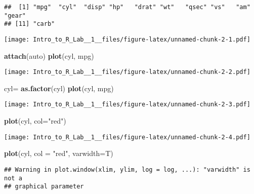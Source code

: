 \documentclass[]{article}
\newenvironment{Shaded}{\begin{snugshade}}{\end{snugshade}}
\newcommand{\KeywordTok}[1]{\textcolor[rgb]{0.13,0.29,0.53}{\textbf{#1}}}
\newcommand{\DataTypeTok}[1]{\textcolor[rgb]{0.13,0.29,0.53}{#1}}
\newcommand{\StringTok}[1]{\textcolor[rgb]{0.31,0.60,0.02}{#1}}
\newcommand{\OperatorTok}[1]{\textcolor[rgb]{0.81,0.36,0.00}{\textbf{#1}}}
\newcommand{\NormalTok}[1]{#1}
\begin{document}
\begin{verbatim}
##  [1] "mpg"  "cyl"  "disp" "hp"   "drat" "wt"   "qsec" "vs"   "am"   "gear"
## [11] "carb"
\end{verbatim}

\begin{Shaded}
\end{Shaded}

\texttt{[image: Intro\_to\_R\_Lab\_\_1\_\_files/figure-latex/unnamed-chunk-2-1.pdf]}

\begin{Shaded}
\begin{Highlighting}[]
\KeywordTok{attach}\NormalTok{(auto)}
\KeywordTok{plot}\NormalTok{(cyl, mpg)}
\end{Highlighting}
\end{Shaded}

\texttt{[image: Intro\_to\_R\_Lab\_\_1\_\_files/figure-latex/unnamed-chunk-2-2.pdf]}

\begin{Shaded}
\begin{Highlighting}[]
\NormalTok{cyl=}\StringTok{ }\KeywordTok{as.factor}\NormalTok{(cyl)}
\KeywordTok{plot}\NormalTok{(cyl, mpg)}
\end{Highlighting}
\end{Shaded}

\texttt{[image: Intro\_to\_R\_Lab\_\_1\_\_files/figure-latex/unnamed-chunk-2-3.pdf]}

\begin{Shaded}
\begin{Highlighting}[]
\KeywordTok{plot}\NormalTok{(cyl, }\DataTypeTok{col=}\StringTok{"red"}\NormalTok{)}
\end{Highlighting}
\end{Shaded}

\texttt{[image: Intro\_to\_R\_Lab\_\_1\_\_files/figure-latex/unnamed-chunk-2-4.pdf]}

\begin{Shaded}
\begin{Highlighting}[]
\KeywordTok{plot}\NormalTok{(cyl, }\DataTypeTok{col =} \StringTok{"red"}\NormalTok{, }\DataTypeTok{varwidth=}\NormalTok{T)}
\end{Highlighting}
\end{Shaded}

\begin{verbatim}
## Warning in plot.window(xlim, ylim, log = log, ...): "varwidth" is not a
## graphical parameter
\end{verbatim}
\end{document}
